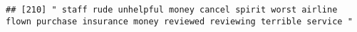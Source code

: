 \documentclass[
]{article}
\begin{document}
\begin{verbatim}
## [210] " staff rude unhelpful money cancel spirit worst airline flown purchase insurance money reviewed reviewing terrible service "                                                                                                                                                                                                                                                                                                                                                                                                                                                                                                                                                                                                                                                                                                                                                                                                                                                                                                                                                                                                                                                                                                                                                                                                                                                                                                                                                                                                                                                                                                                                                                                                                                                                   

\end{verbatim}
\end{document}
